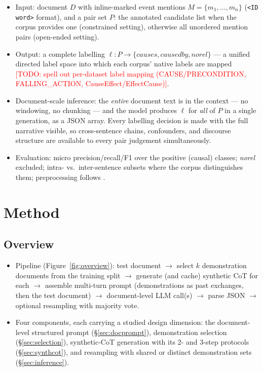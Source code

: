 \documentclass[11pt]{article}
\newcommand{\todo}[1]{\textcolor{red}{[TODO: #1]}}
\begin{document}
\begin{itemize}
  \item Input: document $D$ with inline-marked event mentions
        $M = \{m_1, \dots, m_n\}$ (\texttt{<ID word>} format), and a pair set
        $P$: the annotated candidate list when the corpus provides one
        (constrained setting), otherwise all unordered mention pairs
        (open-ended setting).
  \item Output: a complete labelling $\ell : P \to \{\textit{causes},
        \textit{causedby}, \textit{norel}\}$ --- a unified directed label space
        into which each corpus' native labels are mapped
        \todo{spell out per-dataset label mapping (CAUSE/PRECONDITION,
        FALLING\_ACTION, CauseEffect/EffectCause)}.
  \item Document-scale inference: the \emph{entire} document text is in the
        context --- no windowing, no chunking --- and the model produces $\ell$
        for \emph{all} of $P$ in a single generation, as a JSON array. Every
        labelling decision is made with the full narrative visible, so
        cross-sentence chains, confounders, and discourse structure are
        available to every pair judgement simultaneously.
  \item Evaluation: micro precision/recall/F1 over the positive (causal)
        classes; \textit{norel} excluded; intra- vs.\ inter-sentence subsets
        where the corpus distinguishes them; preprocessing follows
        \citet{gao2023chatgpt}.
\end{itemize}

\section{Method}
\label{sec:method}

\subsection{Overview}
\begin{itemize}
  \item Pipeline (Figure~\ref{fig:overview}): test document $\to$ select $k$
        demonstration documents from the training split $\to$ generate (and
        cache) synthetic CoT for each $\to$ assemble multi-turn prompt
        (demonstrations as past exchanges, then the test document) $\to$
        document-level LLM call(s) $\to$ parse JSON $\to$ optional resampling
        with majority vote.
  \item Four components, each carrying a studied design dimension: the
        document-level structured prompt (\S\ref{sec:docprompt}), demonstration
        selection (\S\ref{sec:selection}), synthetic-CoT generation with its
        2- and 3-step protocols (\S\ref{sec:synthcot}), and resampling with
        shared or distinct demonstration sets (\S\ref{sec:inference}).
\end{itemize}
\end{document}

